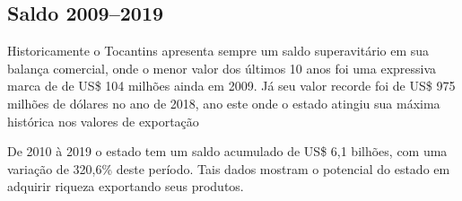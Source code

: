 \subsection{Saldo 2009--2019}

\par Historicamente o Tocantins apresenta sempre um saldo superavitário em sua balança comercial, onde o menor valor dos últimos 10 anos foi uma expressiva marca de de US\$ 104 milhões ainda em 2009. Já seu valor recorde foi de US\$ 975 milhões de dólares no ano de 2018, ano este onde o estado atingiu sua máxima histórica nos valores de exportação

\par De 2010 à 2019 o estado tem um saldo acumulado de US\$ 6,1 bilhões, com uma variação de 320,6\% deste período. Tais dados mostram o potencial do estado em adquirir riqueza exportando seus produtos. 
